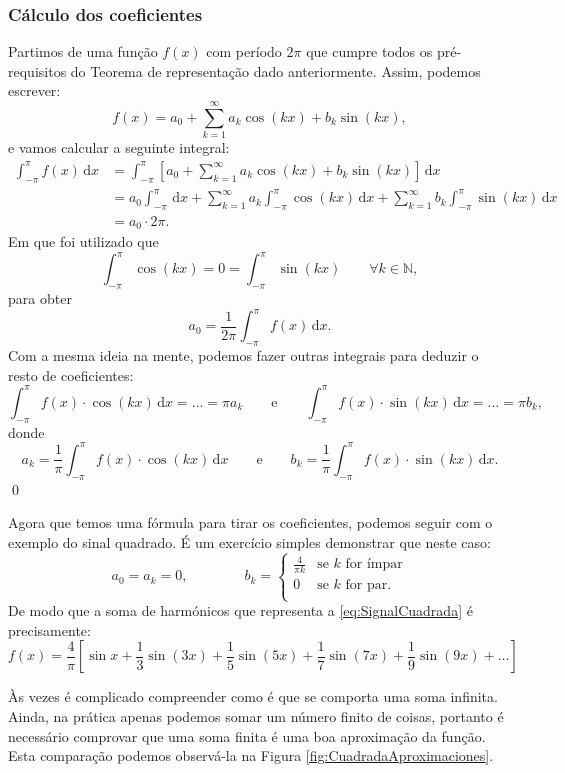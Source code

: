 \subsubsection*{Cálculo dos coeficientes}
Partimos de uma função $f(x)$ com período $2\pi$ que cumpre todos os pré-requisitos do Teorema de representação dado anteriormente. Assim, podemos escrever:
\[
f(x) = a_0 + \sum_{k=1}^\infty a_k\cos(kx) + b_k\sin(kx),
\]
e vamos calcular a seguinte integral:
\begin{align*}
  \int_{-\pi}^{\pi}f(x)\,\mathrm{d}x 
  &=  \int_{-\pi}^{\pi}  \left[a_0 + \sum_{k=1}^\infty a_k\cos(kx) + b_k\sin(kx)\right] \,\mathrm{d}x\\
  &= a_0 \int_{-\pi}^{\pi} \,\mathrm{d}x +  \sum_{k=1}^\infty a_k  \int_{-\pi}^{\pi} \cos(kx) \,\mathrm{d}x + \sum_{k=1}^\infty b_k  \int_{-\pi}^{\pi} \sin(kx) \,\mathrm{d}x\\
  &=  a_0 \cdot 2\pi.
\end{align*}
Em que foi utilizado que
\[
\int_{-\pi}^{\pi} \cos(kx) = 0 = \int_{-\pi}^{\pi} \sin(kx)\qquad \forall k\in \mathbb{N},
\]
para obter
\[
\boxed{a_0 = \frac{1}{2\pi} \int_{-\pi}^{\pi} f(x)\,\mathrm{d}x.}
\]
Com a mesma ideia na mente, podemos fazer outras integrais para deduzir o resto de coeficientes:
\[
\int_{-\pi}^{\pi}f(x) \cdot \cos(kx)\,\mathrm{d}x =\ldots = \pi a_k\qquad\text{e}\qquad  \int_{-\pi}^{\pi}f(x)\cdot  \sin(kx)\,\mathrm{d}x =\ldots = \pi b_k,
\]
donde
\[
\boxed{a_k = \frac{1}{\pi} \int_{-\pi}^{\pi} f(x)\cdot \cos(kx)\,\mathrm{d}x} \qquad \text{e} \qquad  \boxed{b_k = \frac{1}{\pi} \int_{-\pi}^{\pi} f(x)\cdot \sin(kx)\,\mathrm{d}x.}
\]
\qed


Agora que temos uma fórmula para tirar os coeficientes, podemos seguir com o exemplo do sinal quadrado. É um exercício simples demonstrar que neste caso:
\[
a_0 = a_k = 0,\qquad\qquad b_k =
\begin{cases}
  \frac{4}{\pi k}&  \text{se }k\text{ for ímpar}\\
  0              &  \text{se }k\text{ for par. }\\
\end{cases}
\]
De modo que a soma de harmónicos que representa a \eqref{eq:SignalCuadrada} é precisamente:
\begin{equation} \label{eq:Cuadrada}
f(x) = \frac{4}{\pi}\left[\sin x + \frac{1}{3}\sin(3x) + \frac{1}{5}\sin(5x) + \frac{1}{7}\sin(7x) + \frac{1}{9}\sin(9x) + \ldots\right]
\end{equation}


Às vezes é complicado compreender como é que se comporta uma soma infinita. Ainda, na prática apenas podemos somar um número finito de coisas, portanto é necessário comprovar que uma soma finita é uma boa aproximação da função. Esta comparação podemos observá-la na Figura \ref{fig:CuadradaAproximaciones}.

